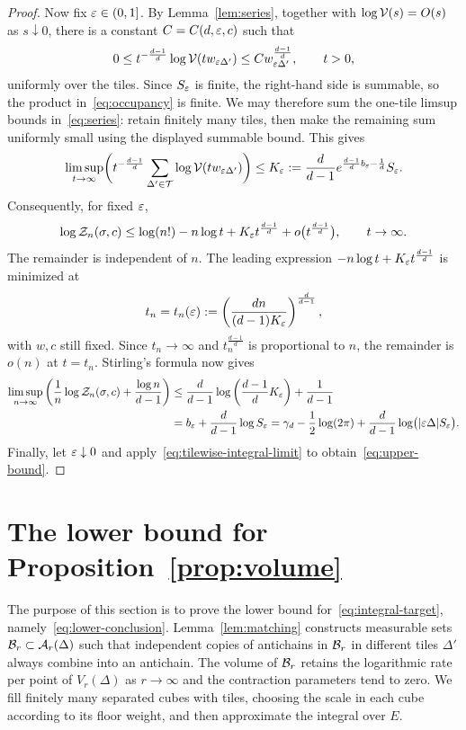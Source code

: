 \documentclass[11pt,letterpaper]{article}
\begin{document}
\begin{proof}
      Now fix $\varepsilon\in(0,1]$. By Lemma~\ref{lem:series}, together with $\log\mathcal V(s)=O(s)$ as $s\downarrow0$, there is a constant $C=C(d,\varepsilon,c)$ such that
      \[
            0\le t^{-\frac{d-1}{d}}\log\mathcal V(tw_{\varepsilon\Delta'})\le Cw_{\varepsilon\Delta'}^{\frac{d-1}{d}},\qquad t>0,
      \]
      uniformly over the tiles. Since $S_\varepsilon$ is finite, the right-hand side is summable, so the product in~\eqref{eq:occupancy} is finite. We may therefore sum the one-tile limsup bounds in~\eqref{eq:series}: retain finitely many tiles, then make the remaining sum uniformly small using the displayed summable bound. This gives
      \[
            \limsup_{t\to\infty}\biggl(t^{-\frac{d-1}{d}}\sum_{\Delta'\in\mathcal T}\log\mathcal V(tw_{\varepsilon\Delta'})\biggr)
            \le K_\varepsilon:=\frac d{d-1}e^{\frac{d-1}{d}b_\varepsilon-\frac1d}S_\varepsilon.
      \]
      Consequently, for fixed $\varepsilon$,
      \[
            \log\mathcal Z_n(\sigma,c) \le\log(n!)-n\log t+K_\varepsilon t^{\frac{d-1}{d}} +o\bigl(t^{\frac{d-1}{d}}\bigr),\qquad t\to\infty.
      \]
      The remainder is independent of $n$. The leading expression $-n\log t+K_\varepsilon t^{\frac{d-1}{d}}$ is minimized at
      \[
            t_n=t_n(\varepsilon) :=\left(\frac{dn}{(d-1)K_\varepsilon}\right)^{\frac d{d-1}},
      \]
      with $w,c$ still fixed. Since $t_n\to\infty$ and $t_n^{\frac{d-1}{d}}$ is proportional to $n$, the remainder is $o(n)$ at $t=t_n$. Stirling's formula now gives
      \[
            \begin{aligned}
                  \limsup_{n\to\infty} \left(\frac1n\log\mathcal Z_n(\sigma,c)+\frac{\log n}{d-1}\right) & \le\frac d{d-1}\log\left(\frac{d-1}{d}K_\varepsilon\right)+\frac1{d-1}                                              \\
                                                                                                  & =b_\varepsilon+\frac d{d-1}\log S_\varepsilon =\gamma_d-\frac12\log(2\pi) +\frac d{d-1}\log\bigl(|\varepsilon\Delta|S_\varepsilon\bigr).
            \end{aligned}
      \]
      Finally, let $\varepsilon\downarrow0$ and apply~\eqref{eq:tilewise-integral-limit} to obtain~\eqref{eq:upper-bound}.
\end{proof}

\section{The lower bound for Proposition~\ref{prop:volume}}\label{sec:lower-bound}

The purpose of this section is to prove the lower bound for~\eqref{eq:integral-target}, namely~\eqref{eq:lower-conclusion}.
Lemma~\ref{lem:matching} constructs measurable sets $\mathcal B_r\subset\mathcal A_r(\Delta)$ such that independent copies of antichains in $\mathcal B_r$ in different tiles $\Delta'$ always combine into an antichain. The volume of $\mathcal B_r$ retains the logarithmic rate per point of $V_r(\Delta)$ as $r\to\infty$ and the contraction parameters tend to zero. We fill finitely many separated cubes with tiles, choosing the scale in each cube according to its floor weight, and then approximate the integral over $E$.
\end{document}
